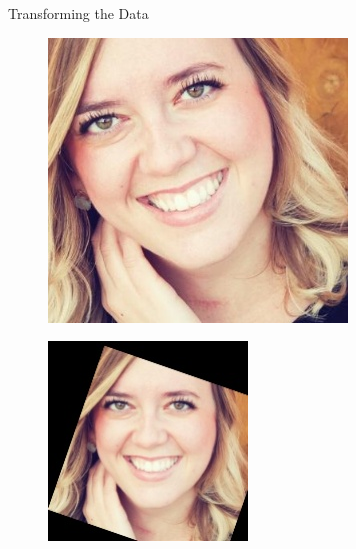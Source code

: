\documentclass[final]{beamer}
\newlength{\onecolwid}
\begin{document}
\begin{frame}[t]
\begin{columns}[t]
\begin{column}{\onecolwid}
\begin{block}{Transforming the Data}
\begin{figure}
\centering
\begin{minipage}{.5\textwidth}
  \centering
  \includegraphics[width=.85\linewidth]{../data/Provo_Crop/Provo128-0_1.jpg}
  \label{fig:crop}
\end{minipage}%
\begin{minipage}{.5\textwidth}
  \centering
  \includegraphics[width=.85\linewidth]{../data/Provo_Affine-color/Provo128-0_1.jpg}
  \label{fig:trans}
\end{minipage}
\end{figure}


\end{block}
\end{column}
\end{columns}
\end{frame}
\end{document}
